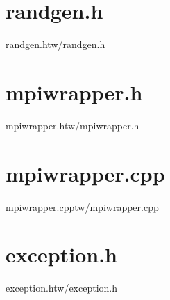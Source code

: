 \section{randgen.h}
\begin{code}{randgen.h}{tw/randgen.h}

\end{code}

\section{mpiwrapper.h}
\begin{code}{mpiwrapper.h}{tw/mpiwrapper.h}

\end{code}

\section{mpiwrapper.cpp}
\begin{code}{mpiwrapper.cpp}{tw/mpiwrapper.cpp}

\end{code}

\section{exception.h}
\begin{code}{exception.h}{tw/exception.h}

\end{code}

